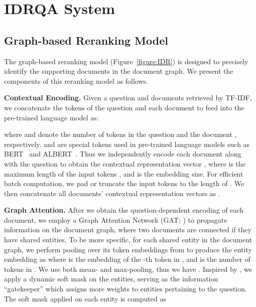 \documentclass[sigconf]{acmart}
\begin{document}
\section{IDRQA System} \label{sec:ddr}
















\subsection{Graph-based Reranking Model} \label{subsec:graph-ranking-model}

The graph-based reranking model (Figure~\ref{figure:IDR}) is designed to precisely identify the supporting documents in the document graph. We present the components of this reranking model as follows.



\BlankLine
\noindent \textbf{Contextual Encoding.}
Given a question  and  documents retrieved by TF-IDF, we concatenate the tokens of the question and each document to feed into the pre-trained language model as:

where  and  denote the number of tokens in the question  and the document , respectively.  and  are special tokens used in pre-trained language models such as BERT~\cite{devlin-etal-2019-bert} and ALBERT~\cite{Lan2020ALBERT:}. Thus we independently encode each document  along with the question  to obtain the contextual representation vector , where  is the maximum length of the input tokens , and  is the embedding size.
For efficient batch computation, we pad or truncate the input tokens to the length of .
We then concatenate all documents' contextual representation vectors as .


\BlankLine
\noindent \textbf{Graph Attention.}
After we obtain the question-dependent encoding of each document, we employ a Graph Attention Network (GAT; \citet{velickovic2018graph}) to propagate information on the document graph, where two documents are connected if they have shared entities. To be more specific, for each shared entity  in the document graph, we perform pooling over its token embeddings from  to produce the entity embedding as  where  is the embedding of the -th token in , and  is the number of tokens in . We use both mean- and max-pooling, thus we have . Inspired by \citet{qiu-etal-2019-dynamically}, we apply a dynamic soft mask on the entities, serving as the information ``gatekeeper'' which assigns more weights to entities pertaining to the question. The soft mask applied on each entity  is computed as
\end{document}
